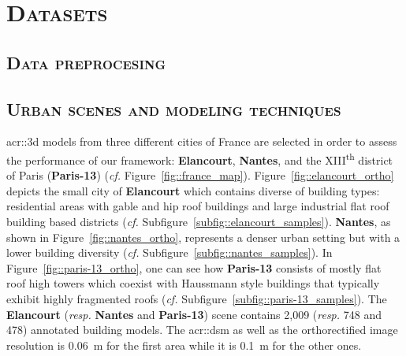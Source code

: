 \minitoc

\vfill

\clearpage

\section{\textsc{Datasets}}
    \label{sec::experiments::datasets}
    
    \subsection{\textsc{Data preprocesing}}
        \label{subsec::experiments::datasets::preprocessing}

    \subsection{\textsc{Urban scenes and modeling techniques}}
        \label{subsec::experiments::datasets::scenes}
        \gls{acr::3d} models from three different cities of France are selected in order to assess the performance of our framework: \textbf{Elancourt}, \textbf{Nantes}, and the XIII\textsuperscript{th} district of Paris (\textbf{Paris-13}) (\textit{cf.} Figure~\ref{fig::france_map}).
        Figure~\ref{fig::elancourt_ortho} depicts the small city of \textbf{Elancourt} which contains diverse of building types: residential areas with gable and hip roof buildings and large industrial flat roof building based districts (\textit{cf.} Subfigure~\ref{subfig::elancourt_samples}).
        \textbf{Nantes}, as shown in Figure~\ref{fig::nantes_ortho}, represents a denser urban setting but with a lower building diversity (\textit{cf.} Subfigure~\ref{subfig::nantes_samples}).
        In Figure~\ref{fig::paris-13_ortho}, one can see how \textbf{Paris-13} consists of mostly flat roof high towers which coexist with Haussmann style buildings that typically exhibit highly fragmented roofs (\textit{cf.} Subfigure~\ref{subfig::paris-13_samples}).
        The \textbf{Elancourt} (\textit{resp.} \textbf{Nantes} and \textbf{Paris-13}) scene contains 2,009 (\textit{resp.} 748 and 478) annotated building models.
        The \gls{acr::dsm} as well as the orthorectified image resolution is \SI{0.06}{\m} for the first area while it is \SI{0.1}{\m} for the other ones.

